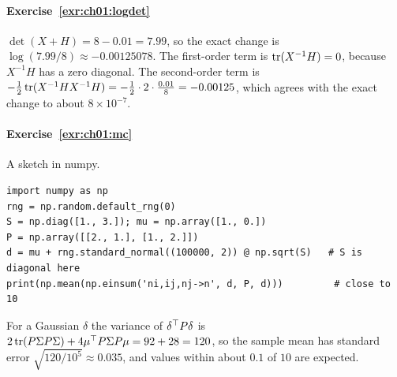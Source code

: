 \paragraph{Exercise~\ref{exr:ch01:logdet}}
$\det(X+H)=8-0.01=7.99$, so the exact change is $\log(7.99/8)\approx-0.00125078$.
The first-order term is $\operatorname{tr}(X^{-1}H)=0$, because $X^{-1}H$ has a zero diagonal.
The second-order term is $-\tfrac12\operatorname{tr}(X^{-1}HX^{-1}H)=-\tfrac12\cdot2\cdot\tfrac{0.01}{8}=-0.00125$,
which agrees with the exact change to about $8\times10^{-7}$.

\paragraph{Exercise~\ref{exr:ch01:mc}}
A sketch in numpy.
\begin{verbatim}
import numpy as np
rng = np.random.default_rng(0)
S = np.diag([1., 3.]); mu = np.array([1., 0.])
P = np.array([[2., 1.], [1., 2.]])
d = mu + rng.standard_normal((100000, 2)) @ np.sqrt(S)   # S is diagonal here
print(np.mean(np.einsum('ni,ij,nj->n', d, P, d)))         # close to 10
\end{verbatim}
For a Gaussian $\delta$ the variance of $\delta^{\top} P\delta$ is
$2\operatorname{tr}(P\Sigma P\Sigma)+4\mu^{\top} P\Sigma P\mu=92+28=120$, so the sample mean has
standard error $\sqrt{120/10^5}\approx0.035$, and values within about $0.1$ of
$10$ are expected.

